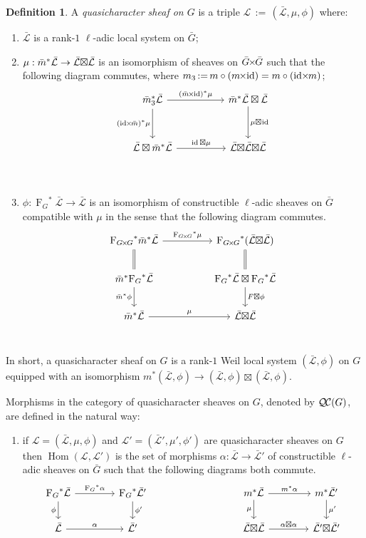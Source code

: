 \documentclass[11pt]{amsart}
\makeatletter
\theoremstyle{plain}
\theoremstyle{definition}
\newtheorem{definition}[theorem]{Definition}
\theoremstyle{remark}
\newcommand{\Frob}[1]{{\operatorname{F}_{#1}}}
\DeclareMathOperator{\Hom}{Hom}
\DeclareMathOperator{\id}{id}
\newcommand{\ceq}{{\, :=\, }}
\newcommand{\cs}[1]{{\mathcal{#1}}}
\newcommand{\gcs}[1]{{\mathcal{\bar #1}}}
\newcommand{\QC}{{\mathcal{Q\hskip-0.8pt C}}}
\newcommand{\labitem}[2]{%
\def\@itemlabel{\textbf{#1}}
\item
\def\@currentlabel{#1}\label{#2}}
\newcommand{\bm}{\bar{m}}
\newcommand{\bG}{\bar{G}}
\newcommand{\tight}[3]{\hspace{-#1pt}{#2}\hspace{-#3pt}}
\newcommand{\bGxG}{\text{$\bar{G} \tight{1}{\times}{1} \bar{G}$}}
\newcommand{\GxxG}{\text{$G \tight{1}{\times}{1} G$}}
\newcommand{\LxL}{\text{$\gcs{L} \tight{0}{\boxtimes}{0} \gcs{L}$}}
\makeatother
\begin{document}
\begin{definition}\label{def:GC}
A \emph{quasicharacter sheaf on $G$} is a triple
$\cs{L}\ceq (\gcs{L},\mu,\phi)$ where:
\begin{enumerate}
\labitem{(CS.0)}{CS.0} $\gcs{L}$ is a rank-$1$ $\ell$-adic local system on $\bG$;
\labitem{(CS.1)}{CS.1} $\mu: \bm^* \gcs{L} \to \LxL$
  is an isomorphism of sheaves on $\bGxG$ such that the following diagram commutes, 
  where $m_3 \ceq m\circ (m\tight{1}{\times}{2}\id) = m\circ (\id\tight{2}{\times}{1} m)$;
%
  \[
  \begin{tikzcd}[row sep=30]
  \bm_3^*\gcs{L} \arrow{rr}{(\bm \tight{1}{\times}{2} \id)^*\mu} \arrow[swap]{d}{(\id \tight{2}{\times}{1} \bm)^*\mu}
    &&  \bm^*\gcs{L} \boxtimes \gcs{L} \dar{\mu \tight{0}{\boxtimes}{1} \id} \\
    \gcs{L} \boxtimes \bm^* \gcs{L} \arrow{rr}{\id \boxtimes \mu}
    &&  \gcs{L} \tight{0}{\boxtimes}{0} \LxL\\
  \end{tikzcd}
  \]
  
%
\labitem{(CS.2)}{CS.2} $\phi : \Frob{G}^* \gcs{L} \to \gcs{L}$ is an
  isomorphism of constructible $\ell$-adic sheaves on $\bG$ compatible with $\mu$ in the sense that the following diagram commutes.
%
  \[
  \begin{tikzcd}[row sep=20]
  \Frob{\GxxG}^* \bm^* \gcs{L} \arrow{rr}{\Frob{\GxxG}^*\mu}
    && \Frob{\GxxG}^*(\LxL)\\
    \arrow[equal]{u} \bm^*  \Frob{G}^* \gcs{L} \arrow[swap]{d}{\bm^* \phi}
    && \Frob{G}^*\gcs{L}\boxtimes \Frob{G}^*\gcs{L} \dar{F\boxtimes \phi} \arrow[equal]{u} \\
    \bm^*\gcs{L} \arrow{rr}{\mu}
    && \LxL\\
  \end{tikzcd}
  \]
\end{enumerate}
In short, a quasicharacter sheaf on $G$  is a rank-$1$ Weil local system $(\gcs{L},\phi)$ on $G$ equipped with an isomorphism $m^* (\gcs{L},\phi) \to (\gcs{L},\phi)\boxtimes (\gcs{L},\phi)$. 


Morphisms in the category of quasicharacter sheaves on $G$, denoted by $\QC(G)$, are defined in the natural way:
\begin{enumerate}
\labitem{(CS.3)}{CS.3} if $\cs{L} = (\gcs{L},\mu,\phi)$ and
  $\cs{L'} = (\gcs{L'},\mu',\phi')$ are quasicharacter sheaves on $G$ then
  $\Hom(\cs{L},\cs{L'})$ is the set of morphisms $\alpha : \gcs{L} \to \gcs{L'}$
  of constructible $\ell$-adic sheaves on $\bG$ such that the following diagrams both commute.
  \[
  \begin{tikzcd}[column sep=40]
  \Frob{G}^* \gcs{L} \rar{\Frob{G}^* \alpha} \arrow[swap]{d}{\phi} & \Frob{G}^* \gcs{L'} \dar{\phi'}
  & %
  & \arrow[swap]{d}{\mu} m^* \gcs{L} \rar{m^* \alpha} & m^* \gcs{L'} \dar{\mu'} \\
  \gcs{L} \rar{\alpha} & \gcs{L'}
  & {} & \LxL \rar{\tight{1}{\alpha\boxtimes \alpha}{1}} & \gcs{L'} \tight{0}{\boxtimes}{0} \gcs{L'}
  \end{tikzcd}
  \]
\end{enumerate}
\end{definition}
\end{document}
